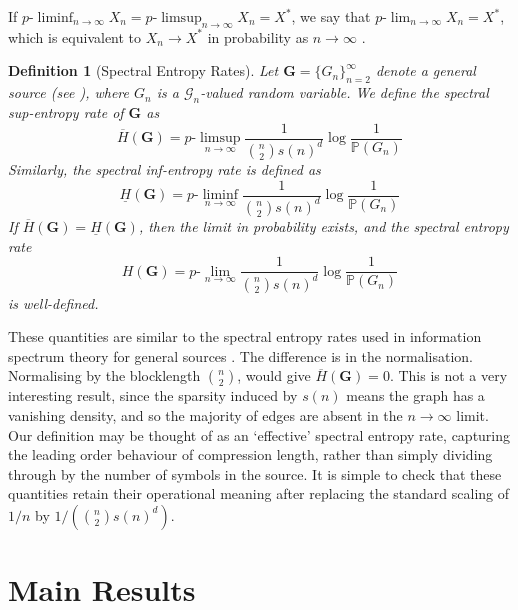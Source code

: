 \documentclass[conference,letterpaper]{IEEEtran}
\newtheorem{definition}{Definition}
\newcommand{\tti}{\rightarrow\infty}
\newcommand{\graph}{\mathcal{G}}
\newcommand{\prob}[1]{\mathbb{P}\left(#1\right)}
\newcommand{\plim}[0]{p\mbox{-}\lim}
\newcommand{\plimsup}[0]{p\mbox{-}\limsup}
\newcommand{\pliminf}[0]{p\mbox{-}\liminf}
\begin{document}
If $\pliminf_{n\tti} X_n = \plimsup_{n\tti} X_n = X^*$, we say that $\plim_{n\tti} X_n = X^*$, which is equivalent to $X_n \to X^*$ in probability as $n\tti$ \cite[\S 1.3]{han_book}.

\begin{definition}[Spectral Entropy Rates]
    Let $\mathbf{G} = \{G_n\}_{n=2}^\infty$ denote a general source (see \cite[\S 1.3]{han_book}), where $G_n$ is a $\graph_n$-valued random variable. We define the spectral sup-entropy rate of $\mathbf{G}$ as
    \begin{equation}
        \overline{H}(\mathbf{G}) = \plimsup_{n\tti} \frac{1}{\binom{n}{2}s(n)^d}\log \frac{1}{\prob{G_n}}
    \end{equation}
    Similarly, the spectral inf-entropy rate is defined as
    \begin{equation}
        \underline{H}(\mathbf{G}) = \pliminf_{n\tti} \frac{1}{\binom{n}{2}s(n)^d}\log \frac{1}{\prob{G_n}}
    \end{equation}
    If $\overline{H}(\mathbf{G}) = \underline{H}(\mathbf{G})$, then the limit in probability exists, and the spectral entropy rate
    \begin{equation}
        H(\mathbf{G}) = \plim_{n\tti} \frac{1}{\binom{n}{2}s(n)^d}\log \frac{1}{\mathbb{P}(G_n)}
    \end{equation}
    is well-defined.
\end{definition}

These quantities are similar to the spectral entropy rates used in information spectrum theory for general sources \cite{han_book}. The difference is in the normalisation. Normalising by the blocklength $\binom{n}{2}$, would give $\overline{H}(\mathbf{G})=0$. This is not a very interesting result, since the sparsity induced by $s(n)$ means the graph has a vanishing density, and so the majority of edges are absent in the $n\to\infty$ limit. Our definition may be thought of as an `effective' spectral entropy rate, capturing the leading order behaviour of compression length, rather than simply dividing through by the number of symbols in the source. It is simple to check that these quantities retain their operational meaning after replacing the standard scaling of $1/n$ by $1/(\binom{n}{2}s(n)^d)$. \\

\vspace{-0.2cm}
\section{Main Results}
\label{sec:results}
\end{document}
